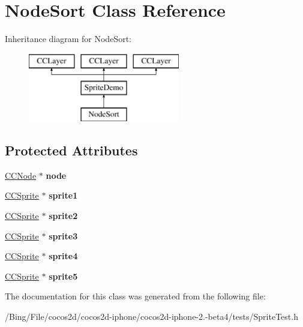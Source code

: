 \hypertarget{interface_node_sort}{\section{Node\-Sort Class Reference}
\label{interface_node_sort}
}
Inheritance diagram for Node\-Sort\-:\begin{figure}[H]
\begin{center}
\leavevmode
\includegraphics[height=3.000000cm]{interface_node_sort}
\end{center}
\end{figure}
\subsection*{Protected Attributes}
\begin{DoxyCompactItemize}
\item 
\hypertarget{interface_node_sort_addd295d1f7204f11aeb5ce12176114c2}{\hyperlink{class_c_c_node}{C\-C\-Node} $\ast$ {\bfseries node}}\label{interface_node_sort_addd295d1f7204f11aeb5ce12176114c2}

\item 
\hypertarget{interface_node_sort_ada4abd755d5e65a4909ff2f170be1350}{\hyperlink{class_c_c_sprite}{C\-C\-Sprite} $\ast$ {\bfseries sprite1}}\label{interface_node_sort_ada4abd755d5e65a4909ff2f170be1350}

\item 
\hypertarget{interface_node_sort_a3a69cd31e07c11863b8f39e5f64d59af}{\hyperlink{class_c_c_sprite}{C\-C\-Sprite} $\ast$ {\bfseries sprite2}}\label{interface_node_sort_a3a69cd31e07c11863b8f39e5f64d59af}

\item 
\hypertarget{interface_node_sort_a85c702251f4d42c927a6005784c1a099}{\hyperlink{class_c_c_sprite}{C\-C\-Sprite} $\ast$ {\bfseries sprite3}}\label{interface_node_sort_a85c702251f4d42c927a6005784c1a099}

\item 
\hypertarget{interface_node_sort_aac236523061b3a26901456dc908901da}{\hyperlink{class_c_c_sprite}{C\-C\-Sprite} $\ast$ {\bfseries sprite4}}\label{interface_node_sort_aac236523061b3a26901456dc908901da}

\item 
\hypertarget{interface_node_sort_a1383c88ea1282141dd9e6fd1ea2ccec4}{\hyperlink{class_c_c_sprite}{C\-C\-Sprite} $\ast$ {\bfseries sprite5}}\label{interface_node_sort_a1383c88ea1282141dd9e6fd1ea2ccec4}

\end{DoxyCompactItemize}


The documentation for this class was generated from the following file\-:\begin{DoxyCompactItemize}
\item 
/\-Bing/\-File/cocos2d/cocos2d-\/iphone/cocos2d-\/iphone-\/2.-\/beta4/tests/Sprite\-Test.\-h\end{DoxyCompactItemize}
